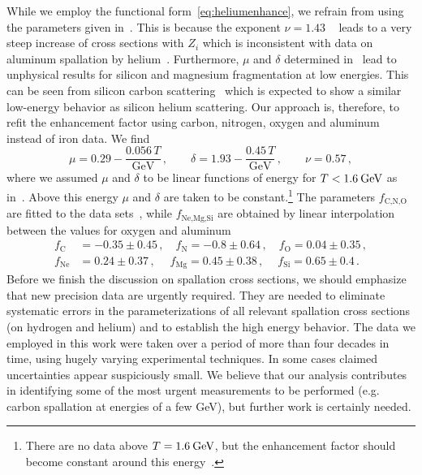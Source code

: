 \documentclass[a4paper,11pt]{article}
\newcommand{\eVdist}{\kern-0.06em}
\newcommand{\gev}{\:\text{Ge\eVdist V}}
\begin{document}
While we employ the functional form~\eqref{eq:heliumenhance}, we refrain from using the parameters given in~\cite{Ferrando:1988tw}. This is because the exponent $\nu=1.43$ ~\cite{Ferrando:1988tw} leads to a very steep increase of cross sections with $Z_i$ which is inconsistent with data on aluminum spallation by helium~\cite{Webber:1990kb}. Furthermore, $\mu$ and $\delta$ determined in~\cite{Ferrando:1988tw} lead to unphysical results for silicon and magnesium fragmentation at low energies. This can be seen from silicon carbon scattering~\cite{Zeitlin:2007sm} which is expected to show a similar low-energy behavior as silicon helium scattering. Our approach is, therefore, to refit the enhancement factor using carbon, nitrogen, oxygen and aluminum instead of iron data. We find
\begin{equation}
 \mu=0.29-\frac{0.056\,T}{\text{GeV}}\,,\qquad \delta=1.93-\frac{0.45\,T}{\text{GeV}}\,,\qquad \nu=0.57\,,
\end{equation}
where we assumed $\mu$ and $\delta$ to be linear functions of energy for $T<1.6\gev$ as in~\cite{Ferrando:1988tw}. Above this energy $\mu$ and $\delta$ are taken to be constant.\footnote{There are no data above $T=1.6\gev$, but the enhancement factor should become constant around this energy~\cite{Ferrando:1988tw}.} The parameters $f_{\text{C,N,O}}$ are fitted to the data sets~\cite{Ferrando:1988tw,Webber:1990kb}, while $f_{\text{Ne,Mg,Si}}$ are obtained by linear interpolation between the values for oxygen and aluminum
\begin{align}
 f_\text{C}&= -0.35\pm 0.45\,,\quad f_{\text{N}}=-0.8\pm 0.64\,,\quad f_{\text{O}}=0.04\pm 0.35\,,\nonumber\\
 f_{\text{Ne}}&=0.24\pm 0.37\,,\;\quad f_{\text{Mg}}=0.45\pm 0.38\,,\quad\:
 f_{\text{Si}}=0.65\pm 0.4\,.
\end{align}
Before we finish the discussion on spallation cross sections, we should emphasize that new precision data are urgently required. They are needed to eliminate systematic errors in the parameterizations of all relevant spallation cross sections (on hydrogen and helium) and to establish the high energy behavior. The data we employed in this work were taken over a period of more than four decades in time, using hugely varying experimental techniques. In some cases claimed uncertainties appear suspiciously small. We believe that our analysis contributes in identifying some of the most urgent measurements to be performed (e.g. carbon spallation at energies of a few GeV), but further work is certainly needed. 
\end{document}
